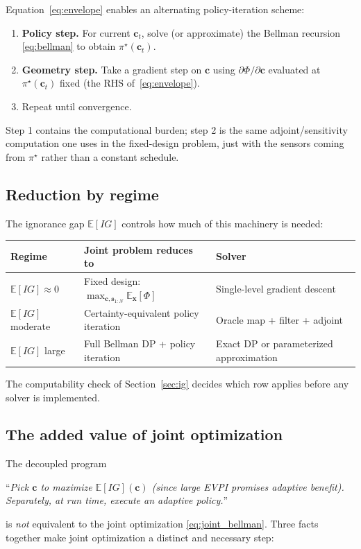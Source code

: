 \documentclass[11pt,a4paper]{article}
\newcommand{\E}{\mathbb{E}}
\begin{document}
Equation~\eqref{eq:envelope} enables an alternating policy-iteration scheme:
\begin{enumerate}[nosep, leftmargin=2em]
  \item \textbf{Policy step.}  For current $\bm{c}_t$, solve (or approximate) the Bellman recursion \eqref{eq:bellman} to obtain $\pi^\star(\bm{c}_t)$.
  \item \textbf{Geometry step.}  Take a gradient step on $\bm{c}$ using $\partial\Phi/\partial\bm{c}$ evaluated at $\pi^\star(\bm{c}_t)$ fixed (the RHS of~\eqref{eq:envelope}).
  \item Repeat until convergence.
\end{enumerate}
Step 1 contains the computational burden; step 2 is the same adjoint/sensitivity computation one uses in the fixed-design problem, just with the sensors coming from $\pi^\star$ rather than a constant schedule.

\subsection{Reduction by regime}

The ignorance gap $\E[IG]$ controls how much of this machinery is needed:
\begin{center}
\begin{tabular}{@{}lll@{}}
\toprule
Regime & Joint problem reduces to & Solver \\
\midrule
$\E[IG] \approx 0$ & Fixed design: $\max_{\bm{c}, \bm{s}_{1:N}} \E_{\bm{x}}[\Phi]$ & Single-level gradient descent \\
$\E[IG]$ moderate & Certainty-equivalent policy iteration & Oracle map + filter + adjoint \\
$\E[IG]$ large & Full Bellman DP + policy iteration & Exact DP or parameterized approximation \\
\bottomrule
\end{tabular}
\end{center}
The computability check of Section~\ref{sec:ig} decides which row applies before any solver is implemented.

\subsection{The added value of joint optimization}
\label{subsec:value_of_joint}

The decoupled program
\begin{center}
``\emph{Pick $\bm{c}$ to maximize $\E[IG](\bm{c})$ (since large EVPI promises adaptive benefit).  Separately, at run time, execute an adaptive policy.}''
\end{center}
is \emph{not} equivalent to the joint optimization \eqref{eq:joint_bellman}.  Three facts together make joint optimization a distinct and necessary step:
\end{document}
